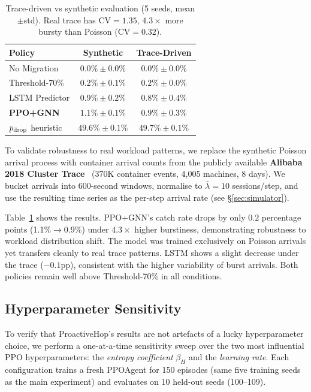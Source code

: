 \documentclass[review,1p]{elsarticle}
\theoremstyle{definition}
\begin{document}
\begin{table}[t]
\centering
\caption{Trace-driven vs synthetic evaluation (5 seeds, mean$\pm$std).
Real trace has CV$=1.35$, $4.3\times$ more bursty than Poisson (CV$=0.32$).}
\label{tab:trace}
\begin{tabular}{lcc}
\toprule
Policy & Synthetic & Trace-Driven \\
\midrule
No Migration     & $0.0\%\pm0.0\%$ & $0.0\%\pm0.0\%$ \\
Threshold-70\%   & $0.2\%\pm0.1\%$ & $0.2\%\pm0.0\%$ \\
LSTM Predictor   & $0.9\%\pm0.2\%$ & $0.8\%\pm0.4\%$ \\
\textbf{PPO+GNN} & $\mathbf{1.1\%\pm0.1\%}$ & $\mathbf{0.9\%\pm0.3\%}$ \\
$p_{\rm drop}$ heuristic & $49.6\%\pm0.1\%$ & $49.7\%\pm0.1\%$ \\
\bottomrule
\end{tabular}
\end{table}

To validate robustness to real workload patterns, we replace the
synthetic Poisson arrival process with container arrival counts from
the publicly available \textbf{Alibaba 2018 Cluster Trace}~\cite{alibaba2018}
(370K container events, 4,005 machines, 8 days).
We bucket arrivals into 600-second windows, normalise to
$\bar{\lambda}=10$ sessions/step, and use the resulting time series
as the per-step arrival rate (see \S\ref{sec:simulator}).

Table~\ref{tab:trace} shows the results.  PPO+GNN's catch rate
drops by only $0.2$ percentage points (1.1\%$\to$0.9\%) under
$4.3\times$ higher burstiness, demonstrating robustness to
workload distribution shift.  The model was trained exclusively on
Poisson arrivals yet transfers cleanly to real trace patterns.
LSTM shows a slight decrease under the trace ($-0.1$pp), consistent
with the higher variability of burst arrivals.
Both policies remain well above Threshold-70\%
in all conditions.

\subsection{Hyperparameter Sensitivity}
\label{sec:sensitivity}

To verify that ProactiveHop's results are not artefacts of a
lucky hyperparameter choice, we perform a one-at-a-time sensitivity
sweep over the two most influential PPO hyperparameters: the
\emph{entropy coefficient} $\beta_H$ and the \emph{learning rate}.
Each configuration trains a fresh PPOAgent for 150 episodes
(same five training seeds as the main experiment) and evaluates
on 10 held-out seeds (100--109).
\end{document}
